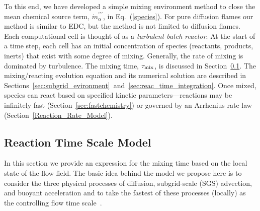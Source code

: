 To this end, we have developed a simple mixing environment method to close the mean chemical source term, $\dot{m}^{\prime\prime\prime}_{\alpha}$, in Eq.~(\ref{species}).  For pure diffusion flames our method is similar to EDC, but the method is not limited to diffusion flames.  Each computational cell is thought of as a {\em turbulent batch reactor}. At the start of a time step, each cell has an initial concentration of species (reactants, products, inerts) that exist with some degree of mixing. Generally, the rate of mixing is dominated by turbulence. The mixing time, $\tau_{\rm mix}$, is discussed in Section~\ref{sec:reac_time_scale}. The mixing/reacting evolution equation and its numerical solution are described in Sections~\ref{sec:subgrid_evironment}~and~\ref{sec:reac_time_integration}. Once mixed, species can react based on specified kinetic parameters---reactions may be infinitely fast (Section~\ref{sec:fastchemistry}) or governed by an Arrhenius rate law (Section~\ref{Reaction_Rate_Model}).


\subsection{Reaction Time Scale Model}
\label{sec:reac_time_scale}

In this section we provide an expression for the mixing time based on the local state of the flow field.  The basic idea behind the model we propose here is to consider the three physical processes of diffusion, subgrid-scale (SGS) advection, and buoyant acceleration and to take the fastest of these processes (locally) as the controlling flow time scale~\cite{McDermott:2011}.

